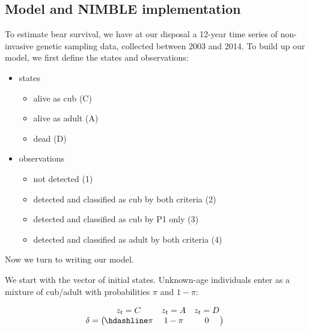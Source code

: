\documentclass[
  12pt,
]{krantz}
\providecommand{\tightlist}{%
  \setlength{\itemsep}{0pt}\setlength{\parskip}{0pt}}
\begin{document}
\subsection{Model and NIMBLE implementation}\label{model-and-nimble-implementation-1}

To estimate bear survival, we have at our disposal a 12-year time series of non-invasive genetic sampling data, collected between 2003 and 2014. To build up our model, we first define the states and observations:

\begin{itemize}
\tightlist
\item
  states

  \begin{itemize}
  \tightlist
  \item
    alive as cub (C)
  \item
    alive as adult (A)
  \item
    dead (D)
  \end{itemize}
\item
  observations

  \begin{itemize}
  \tightlist
  \item
    not detected (1)
  \item
    detected and classified as cub by both criteria (2)
  \item
    detected and classified as cub by P1 only (3)
  \item
    detected and classified as adult by both criteria (4)
  \end{itemize}
\end{itemize}

Now we turn to writing our model.

We start with the vector of initial states. Unknown-age individuals enter as a mixture of cub/adult with probabilities \(\pi\) and \(1-\pi\):

\[\begin{matrix}
& \\
\mathbf{\delta} =
  \left ( \vphantom{ \begin{matrix} 12 \end{matrix} } \right .
          \end{matrix}
          \hspace{-1.2em}
          \begin{matrix}
          z_t=C & z_t=A & z_t=D \\ \hdashline
          \pi & 1 - \pi & 0\\
          \end{matrix}
          \hspace{-0.2em}
          \begin{matrix}
          & \\
          \left . \vphantom{ \begin{matrix} 12 \end{matrix} } \right )
\begin{matrix}
\end{matrix}
\end{matrix}\]
\end{document}
